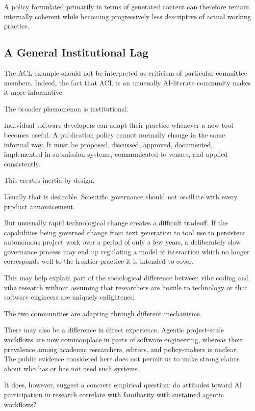 A policy formulated primarily in terms of generated content can therefore remain internally coherent while becoming progressively less descriptive of actual working practice.


\subsection{A General Institutional Lag}

The ACL example should not be interpreted as criticism of particular committee members. Indeed, the fact that ACL is an unusually AI-literate community makes it more informative.

The broader phenomenon is institutional.

Individual software developers can adapt their practice whenever a new tool becomes useful. A publication policy cannot normally change in the same informal way. It must be proposed, discussed, approved, documented, implemented in submission systems, communicated to venues, and applied consistently.

This creates inertia by design.

Usually that is desirable. Scientific governance should not oscillate with every product announcement.

But unusually rapid technological change creates a difficult tradeoff. If the capabilities being governed change from text generation to tool use to persistent autonomous project work over a period of only a few years, a deliberately slow governance process may end up regulating a model of interaction which no longer corresponds well to the frontier practice it is intended to cover.

This may help explain part of the sociological difference between vibe coding and vibe research without assuming that researchers are hostile to technology or that software engineers are uniquely enlightened.

The two communities are adapting through different mechanisms.

There may also be a difference in direct experience. Agentic project-scale workflows are now commonplace in parts of software engineering, whereas their prevalence among academic researchers, editors, and policy-makers is unclear. The public evidence considered here does not permit us to make strong claims about who has or has not used such systems.

It does, however, suggest a concrete empirical question: do attitudes toward AI participation in research correlate with familiarity with sustained agentic workflows?


